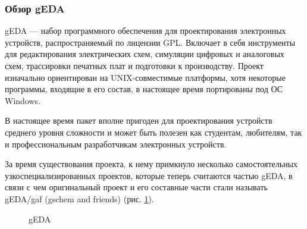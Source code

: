 \subsubsection{Обзор gEDA}
\begin{par}
gEDA --- набор программного обеспечения для проектирования электронных устройств,
распространяемый по лицензии GPL. Включает в себя инструменты для редактирования
электрических схем, симуляции цифровых и аналоговых схем, трассировки печатных плат
и подготовки к производству. Проект изначально ориентирован на UNIX-совместимые
платформы, хотя некоторые программы, входящие в его состав, в настоящее время
портированы под ОС Windows\cite{geda}.
\end{par}
\begin{par}
В настоящее время пакет вполне пригоден для проектирования устройств среднего уровня
сложности и может быть полезен как студентам, любителям, так и профессиональным
разработчикам электронных устройств.
\end{par}
\begin{par}
За время существования проекта, к нему примкнуло несколько самостоятельных
узкоспециализированных проектов, которые теперь считаются частью gEDA, в
связи с чем оригинальный проект и его составные части стали называть
gEDA/gaf (gschem and friends) (рис. \ref{img:geda}).
\begin{figure}[h]
	\caption{gEDA}
	\label{img:geda}
\end{figure}
\end{par}

